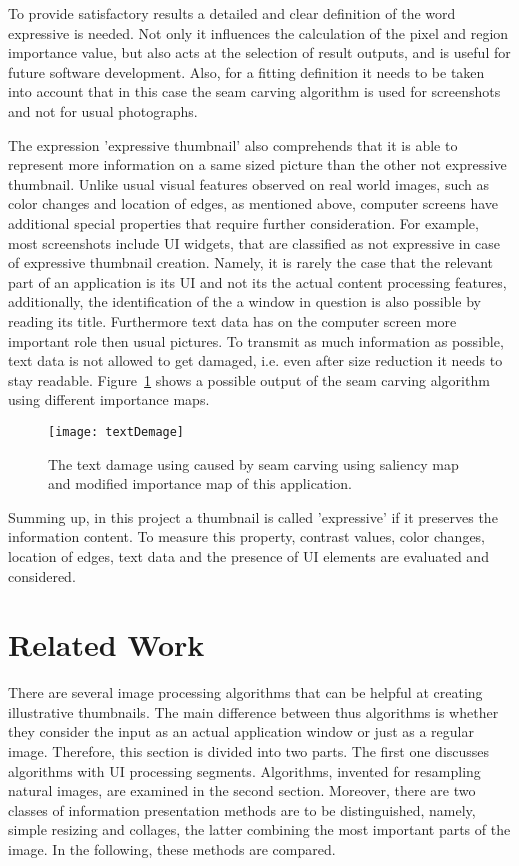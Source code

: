 \documentclass[draft,final]{vutinfth} %
\begin{document}
	To provide satisfactory results a detailed and clear definition of the word expressive is needed.
	Not only it influences the calculation of the pixel and region importance value, but also acts at the selection of result outputs, and is useful for future software development.
	Also, for a fitting definition it needs to be taken into account that in this case the seam carving algorithm is used for screenshots and not for usual photographs.\par 
	The expression 'expressive thumbnail' also comprehends that it is able to represent more information on a same sized picture than the other not expressive thumbnail.
	Unlike usual visual features observed on real world images, such as color changes and location of edges, as mentioned above, computer screens have additional special properties that require further consideration.
	For example, most screenshots include UI widgets, that are classified as not expressive in case of expressive thumbnail creation.
	Namely, it is rarely the case that the relevant part of an application is its UI and not its the actual content processing features, additionally, the identification of the a window in question is also possible by reading its title.
	Furthermore text data has on the computer screen more important role then usual pictures.
	To transmit as much information as possible, text data is not allowed to get damaged, i.e. even after size reduction it needs to stay readable.
	Figure~\ref{fig:textDamage} shows a possible output of the seam carving algorithm using different importance maps.\par 
	\begin{figure}[H]
		\centering		
		\texttt{[image: textDemage]}
		\caption{The text damage using caused by seam carving using saliency map and modified importance map of this application. }
		\label{fig:textDamage}
	\end{figure} 
	Summing up, in this project a thumbnail is called 'expressive' if it preserves the information content.
	To measure this property, contrast values, color changes, location of edges, text data and the presence of UI elements are evaluated and considered.            
	
	\chapter{Related Work}
	There are several image processing algorithms that can be helpful at creating illustrative thumbnails.
	The main difference between thus algorithms is whether they consider the input as an actual application window or just as a regular image.
	Therefore, this section is divided into two parts.
	The first one discusses algorithms with UI processing segments.
	Algorithms, invented for resampling natural images, are examined in the second section. 
	Moreover, there are two classes of information presentation methods are to be distinguished, namely, simple resizing and collages, the latter combining the most important parts of the image. 
	In the following, these methods are compared.
	
\end{document}
